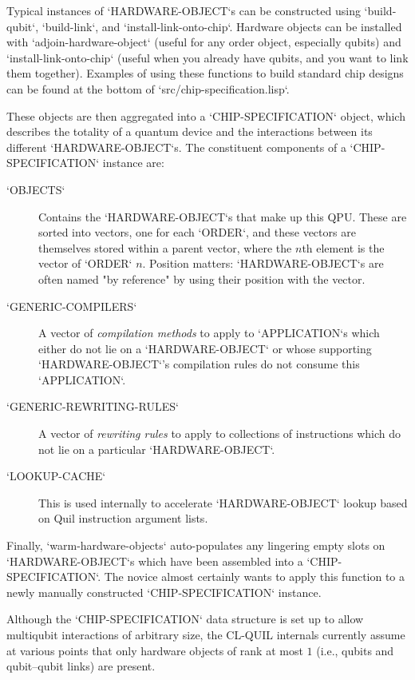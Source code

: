 Typical instances of `HARDWARE-OBJECT`s can be constructed using `build-qubit`, `build-link`, and `install-link-onto-chip`.  Hardware objects can be installed with `adjoin-hardware-object` (useful for any order object, especially qubits) and `install-link-onto-chip` (useful when you already have qubits, and you want to link them together).  Examples of using these functions to build standard chip designs can be found at the bottom of `src/chip-specification.lisp`.

These objects are then aggregated into a `CHIP-SPECIFICATION` object, which describes the totality of a quantum device and the interactions between its different `HARDWARE-OBJECT`s.  The constituent components of a `CHIP-SPECIFICATION` instance are:

\begin{description}
	\item[`OBJECTS`] Contains the `HARDWARE-OBJECT`s that make up this QPU.  These are sorted into vectors, one for each `ORDER`, and these vectors are themselves stored within a parent vector, where the $n$th element is the vector of `ORDER` $n$.  Position matters: `HARDWARE-OBJECT`s are often named "by reference" by using their position with the vector.
	\item[`GENERIC-COMPILERS`] A vector of \textit{compilation methods} to apply to `APPLICATION`s which either do not lie on a `HARDWARE-OBJECT` or whose supporting `HARDWARE-OBJECT`'s compilation rules do not consume this `APPLICATION`.
	\item[`GENERIC-REWRITING-RULES`] A vector of \textit{rewriting rules} to apply to collections of instructions which do not lie on a particular `HARDWARE-OBJECT`.
	\item[`LOOKUP-CACHE`] This is used internally to accelerate `HARDWARE-OBJECT` lookup based on Quil instruction argument lists.
\end{description}

Finally, `warm-hardware-objects` auto-populates any lingering empty slots on `HARDWARE-OBJECT`s which have been assembled into a `CHIP-SPECIFICATION`.  The novice almost certainly wants to apply this function to a newly manually constructed `CHIP-SPECIFICATION` instance.

\begin{remark}
Although the `CHIP-SPECIFICATION` data structure is set up to allow multiqubit interactions of arbitrary size, the CL-QUIL internals currently assume at various points that only hardware objects of rank at most $1$ (i.e., qubits and qubit--qubit links) are present.
\end{remark}

